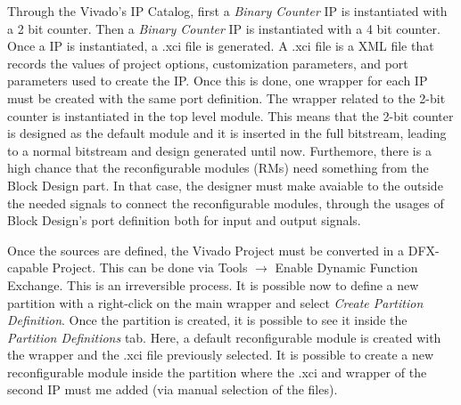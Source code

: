 Through the Vivado's IP Catalog, first a \textit{Binary Counter} IP is instantiated with a 2 bit counter. Then a \textit{Binary Counter} IP is instantiated with a 4 bit counter. Once a IP is instantiated, a .xci file is generated. A .xci file is a XML file that records the values of project options, customization parameters, and port parameters used to create the IP. Once this is done, one wrapper for each IP must be created with the same port definition. The wrapper related to the 2-bit counter is instantiated in the top level module. This means that the 2-bit counter is designed as the default module and it is inserted in the full bitstream, leading to a normal bitstream and design generated until now. Furthemore, there is a high chance that the reconfigurable modules (RMs) need something from the Block Design part. In that case, the designer must make avaiable to the outside the needed signals to connect the reconfigurable modules, through the usages of Block Design's port definition both for input and output signals. \bigskip



Once the sources are defined, the Vivado Project must be converted in a DFX-capable Project. This can be done via Tools $\rightarrow$ Enable Dynamic Function Exchange. This is an irreversible process. It is possible now to define a new partition with a right-click on the main wrapper and select \textit{Create Partition Definition}. Once the partition is created, it is possible to see it inside the \textit{Partition Definitions} tab. Here, a default reconfigurable module is created with the wrapper and the .xci file previously selected. It is possible to create a new reconfigurable module inside the partition where the .xci and wrapper of the second IP must me added (via manual selection of the files).

